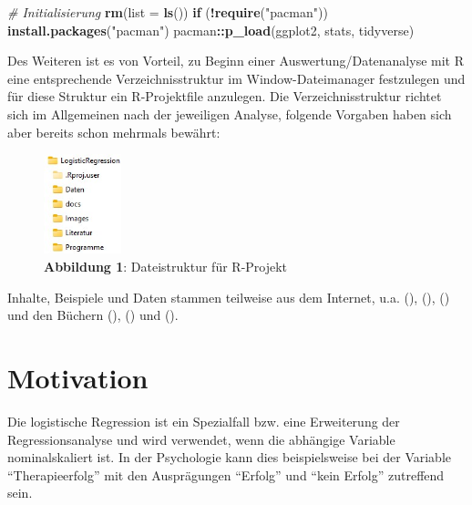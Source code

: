 \documentclass[
]{article}
\newenvironment{Shaded}{\begin{snugshade}}{\end{snugshade}}
\newcommand{\AttributeTok}[1]{\textcolor[rgb]{0.13,0.29,0.53}{#1}}
\newcommand{\CommentTok}[1]{\textcolor[rgb]{0.56,0.35,0.01}{\textit{#1}}}
\newcommand{\ControlFlowTok}[1]{\textcolor[rgb]{0.13,0.29,0.53}{\textbf{#1}}}
\newcommand{\FunctionTok}[1]{\textcolor[rgb]{0.13,0.29,0.53}{\textbf{#1}}}
\newcommand{\NormalTok}[1]{#1}
\newcommand{\SpecialCharTok}[1]{\textcolor[rgb]{0.81,0.36,0.00}{\textbf{#1}}}
\newcommand{\StringTok}[1]{\textcolor[rgb]{0.31,0.60,0.02}{#1}}
\begin{document}
\begin{Shaded}
\begin{Highlighting}[]
\CommentTok{\# Initialisierung}
\FunctionTok{rm}\NormalTok{(}\AttributeTok{list =} \FunctionTok{ls}\NormalTok{())}
\ControlFlowTok{if}\NormalTok{ (}\SpecialCharTok{!}\FunctionTok{require}\NormalTok{(}\StringTok{"pacman"}\NormalTok{)) }\FunctionTok{install.packages}\NormalTok{(}\StringTok{"pacman"}\NormalTok{)}
\NormalTok{pacman}\SpecialCharTok{::}\FunctionTok{p\_load}\NormalTok{(ggplot2, stats, tidyverse)}
\end{Highlighting}
\end{Shaded}

Des Weiteren ist es von Vorteil, zu Beginn einer Auswertung/Datenanalyse mit R eine entsprechende Verzeichnisstruktur im Window-Dateimanager festzulegen und für diese Struktur ein R-Projektfile anzulegen. Die Verzeichnisstruktur richtet sich im Allgemeinen nach der jeweiligen Analyse, folgende Vorgaben haben sich aber bereits schon mehrmals bewährt:

\begin{figure}
\centering
\includegraphics[width=0.2\textwidth,height=\textheight]{Images/LogisticRegression.JPG}
\caption{\textbf{Abbildung 1}: Dateistruktur für R-Projekt}
\end{figure}

Inhalte, Beispiele und Daten stammen teilweise aus dem Internet, u.a. (), (), () und den Büchern (), () und ().

\section*{Motivation}\label{motivation}

Die logistische Regression ist ein Spezialfall bzw. eine Erweiterung der Regressionsanalyse und wird verwendet, wenn die abhängige Variable nominalskaliert ist. In der Psychologie kann dies beispielsweise bei der Variable ``Therapieerfolg'' mit den Ausprägungen ``Erfolg'' und ``kein Erfolg'' zutreffend sein.
\end{document}
